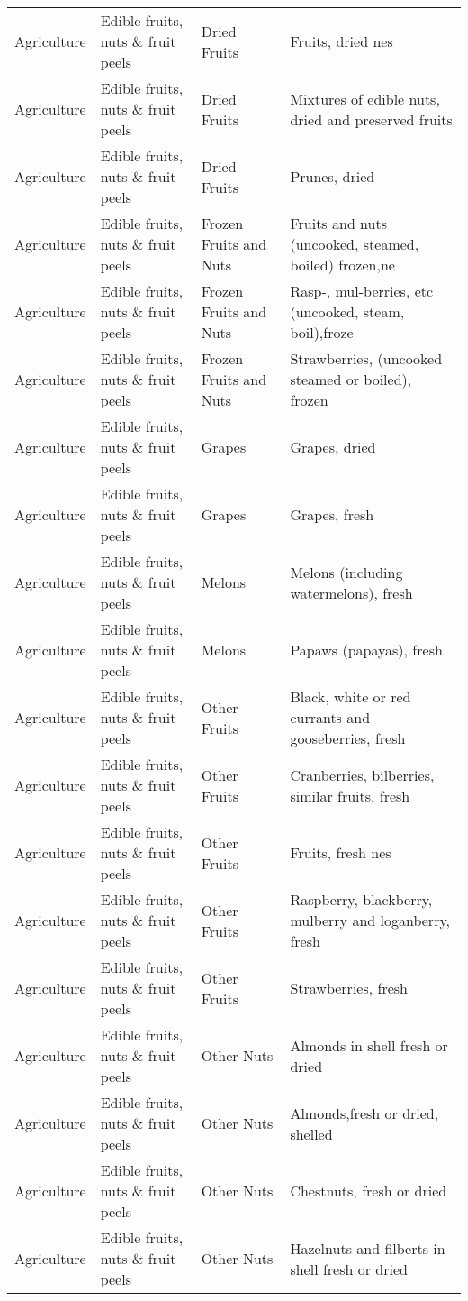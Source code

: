 \begin{appendices}
\begin{xltabular}{\textwidth}{|p{0.07\textwidth}|p{0.28\textwidth}|p{0.24\textwidth}|p{0.31\textwidth}|}
	Agriculture & Edible fruits, nuts \& fruit peels & Dried Fruits & Fruits, dried nes \\
	Agriculture & Edible fruits, nuts \& fruit peels & Dried Fruits & Mixtures of edible nuts, dried and preserved fruits \\
	Agriculture & Edible fruits, nuts \& fruit peels & Dried Fruits & Prunes, dried \\
	Agriculture & Edible fruits, nuts \& fruit peels & Frozen Fruits and Nuts & Fruits and nuts (uncooked, steamed, boiled) frozen,ne \\
	Agriculture & Edible fruits, nuts \& fruit peels & Frozen Fruits and Nuts & Rasp-, mul-berries, etc (uncooked, steam, boil),froze \\
	Agriculture & Edible fruits, nuts \& fruit peels & Frozen Fruits and Nuts & Strawberries, (uncooked steamed or boiled), frozen \\
	Agriculture & Edible fruits, nuts \& fruit peels & Grapes & Grapes, dried \\
	Agriculture & Edible fruits, nuts \& fruit peels & Grapes & Grapes, fresh \\
	Agriculture & Edible fruits, nuts \& fruit peels & Melons & Melons (including watermelons), fresh \\
	Agriculture & Edible fruits, nuts \& fruit peels & Melons & Papaws (papayas), fresh \\
	Agriculture & Edible fruits, nuts \& fruit peels & Other Fruits & Black, white or red currants and gooseberries, fresh \\
	Agriculture & Edible fruits, nuts \& fruit peels & Other Fruits & Cranberries, bilberries, similar fruits, fresh \\
	Agriculture & Edible fruits, nuts \& fruit peels & Other Fruits & Fruits, fresh nes \\
	Agriculture & Edible fruits, nuts \& fruit peels & Other Fruits & Raspberry, blackberry, mulberry and loganberry, fresh \\
	Agriculture & Edible fruits, nuts \& fruit peels & Other Fruits & Strawberries, fresh \\
	Agriculture & Edible fruits, nuts \& fruit peels & Other Nuts & Almonds in shell fresh or dried \\
	Agriculture & Edible fruits, nuts \& fruit peels & Other Nuts & Almonds,fresh or dried, shelled \\
	Agriculture & Edible fruits, nuts \& fruit peels & Other Nuts & Chestnuts, fresh or dried \\
	Agriculture & Edible fruits, nuts \& fruit peels & Other Nuts & Hazelnuts and filberts in shell fresh or dried \\

\end{xltabular}
\end{appendices}
